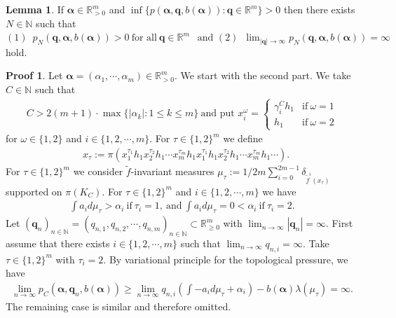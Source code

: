 \documentclass{article}
\theoremstyle{definition}
\newtheorem{lemma}[thm]{Lemma}
\newtheorem*{pf}{Proof}
\begin{document}
\begin{lemma}\label{positive approximation}
  If $\boldsymbol{\alpha}\in\mathbb{R}_{>0}^m$ and 
    $\inf \lbrace p(\boldsymbol{\alpha},\boldsymbol{q},b(\boldsymbol{\alpha})):\boldsymbol{q}\in\mathbb{R}^m\rbrace>0$
    then there exists $N\in\mathbb{N}$ such that
   $(1)\,\,\, p_{N}(\boldsymbol{q},\boldsymbol{\alpha},b(\boldsymbol{\alpha}))>0\ \text{for\ all}\ \boldsymbol{q}\in\mathbb{R}^m\ \ \textrm{ and }
(2)\,\,\, \lim_{|\boldsymbol{q}|\to\infty}p_{N}(\boldsymbol{q},\boldsymbol{\alpha},b(\boldsymbol{\alpha}))=\infty$ \textrm{ hold}. 
\end{lemma}
\begin{pf}
    Let $\boldsymbol{\alpha}=(\alpha_1,\cdots,\alpha_m)\in \mathbb{R}^m_{>0}$. 
    We start with the second part. We take $C\in\mathbb{N}$ such that
    \begin{align*}
        C> 2(m+1)\cdot{\max\lbrace |\alpha_k|:1\leq k\leq m\rbrace}\ \text{and\ put\ }  x_{i}^{\omega}=\left\{
 \begin{array}{ll}
   \gamma_i^Ch_1   & \text{if}\ \omega=1 \\
   h_1   & \text{if} \ \omega=2\nonumber
 \end{array}
 \right. 
    \end{align*}
    {for} $\omega\in\lbrace1,2\rbrace$ and $i\in\{1,2,\cdots,m\}$.
 For $\tau\in\lbrace1,2\rbrace^m$ we define    
  \begin{align*}
      &x_{\tau}:=\pi(x_{1}^{\tau_1}h_1x_{2}^{\tau_2}h_1\cdots x_{m}^{\tau_m}h_1x_{1}^{\tau_1}h_1x_{2}^{\tau_2}h_1\cdots x_{m}^{\tau_m}h_1\cdots).
  \end{align*}   
For $\tau\in\lbrace1,2\rbrace^m$ we consider $\tilde f$-invariant measures $\mu_{\tau}:=1/2m\sum_{i=0}^{2m-1}\delta_{\tilde f^i(x_{\tau})}$ supported on $\pi(K_C)$.    
For $\tau\in\lbrace1,2\rbrace^m$ and $i\in\{1,2,\cdots,m\}$ we have
\begin{align}
    \int a_i d\mu_\tau>\alpha_i\ \text{if}\ \tau_i=1,\ \text{and}\ 
    \int a_i d\mu_\tau=0<\alpha_i\ \text{if}\ \tau_i=2\nonumber.
\end{align}
Let $(\boldsymbol{q}_n)_{n\in\mathbb{N}}=(q_{n,1},q_{n,2},\cdots,q_{n,m})_{n\in\mathbb{N}}\subset\mathbb{R}^m_{\geq 0}$ with $\lim_{n\to\infty}|\boldsymbol{q}_n|=\infty$.
First assume that there exists $i\in \lbrace1,2,\cdots,m\rbrace$ such that $\lim_{n\to\infty}q_{n,i}= \infty$. Take $\tau\in\{1,2\}^m$ with $\tau_i=2$. By variational principle for the topological pressure, we have
\begin{align}
    \lim_{n \to \infty}p_{C}(\boldsymbol{\alpha},\boldsymbol{q}_n,b(\boldsymbol{\alpha}))\nonumber\nonumber
    \geq \lim_{n\to\infty}q_{n,i}\left(\int -a_id\mu_{\tau} +\alpha_i\right)-b(\boldsymbol{\alpha})\lambda(\mu_{\tau})=\infty.\nonumber
\end{align} 
The remaining case is similar and therefore omitted.


\end{pf}
\end{document}
